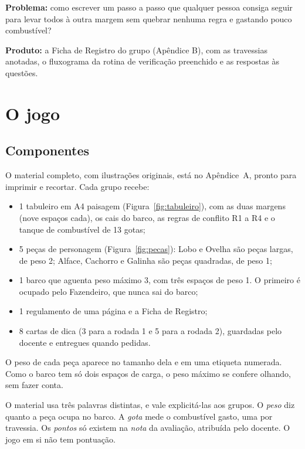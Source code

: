 \documentclass[12pt,a4paper]{article}
\begin{document}
\textbf{Problema:} como escrever um passo a passo que qualquer pessoa
consiga seguir para levar todos à outra margem sem quebrar nenhuma regra e
gastando pouco combustível?

\textbf{Produto:} a Ficha de Registro do grupo (Apêndice B), com as travessias
anotadas, o fluxograma da rotina de verificação preenchido e as respostas às
questões.

\section{O jogo}

\subsection{Componentes}

O material completo, com ilustrações originais, está no Apêndice~A, pronto para
imprimir e recortar. Cada grupo recebe:

\begin{itemize}
  \item 1 tabuleiro em A4 paisagem (Figura~\ref{fig:tabuleiro}), com as duas
        margens (nove espaços cada), os cais do barco, as regras de conflito
        R1 a R4 e o tanque de combustível de 13 gotas;
  \item 5 peças de personagem (Figura~\ref{fig:pecas}): Lobo e Ovelha são peças
        largas, de peso 2; Alface, Cachorro e Galinha são peças quadradas, de
        peso 1;
  \item 1 barco que aguenta peso máximo 3, com três espaços de peso 1. O
        primeiro é ocupado pelo Fazendeiro, que nunca sai do barco;
  \item 1 regulamento de uma página e a Ficha de Registro;
  \item 8 cartas de dica (3 para a rodada 1 e 5 para a rodada 2), guardadas pelo docente e entregues quando pedidas.
\end{itemize}

O peso de cada peça aparece no tamanho dela e em uma etiqueta numerada. Como o
barco tem só dois espaços de carga, o peso máximo se confere olhando, sem fazer
conta.

O material usa três palavras distintas, e vale explicitá-las aos grupos. O
\textit{peso} diz quanto a peça ocupa no barco. A \textit{gota} mede o
combustível gasto, uma por travessia. Os \textit{pontos} só existem na
\textit{nota} da avaliação, atribuída pelo docente. O jogo em si não tem
pontuação.
\end{document}
